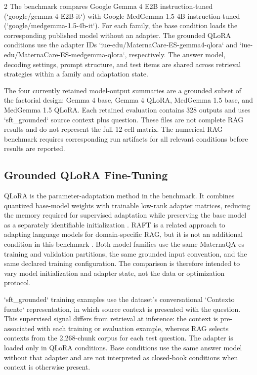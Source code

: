\documentclass[11pt]{article}
\begin{document}
\begin{multicols}{2}
The benchmark compares Google Gemma 4 E2B instruction-tuned (`google/gemma-4-E2B-it`) with Google MedGemma 1.5 4B instruction-tuned (`google/medgemma-1.5-4b-it`). For each family, the base condition loads the corresponding published model without an adapter. The grounded QLoRA conditions use the adapter IDs `iue-edu/MaternaCare-ES-gemma4-qlora` and `iue-edu/MaternaCare-ES-medgemma-qlora`, respectively. The answer model, decoding settings, prompt structure, and test items are shared across retrieval strategies within a family and adaptation state.

The four currently retained model-output summaries are a grounded subset of the factorial design: Gemma 4 base, Gemma 4 QLoRA, MedGemma 1.5 base, and MedGemma 1.5 QLoRA. Each retained evaluation contains 328 outputs and uses `sft\_grounded` source context plus question. These files are not complete RAG results and do not represent the full 12-cell matrix. The numerical RAG benchmark requires corresponding run artifacts for all relevant conditions before results are reported.

\subsection{Grounded QLoRA Fine-Tuning}

QLoRA is the parameter-adaptation method in the benchmark. It combines quantized base-model weights with trainable low-rank adapter matrices, reducing the memory required for supervised adaptation while preserving the base model as a separately identifiable initialization \cite{Dettmers2023QLoRA}. RAFT is a related approach to adapting language models for domain-specific RAG, but it is not an additional condition in this benchmark \cite{Zhang2024RAFT}. Both model families use the same MaternaQA-es training and validation partitions, the same grounded input convention, and the same declared training configuration. The comparison is therefore intended to vary model initialization and adapter state, not the data or optimization protocol.

`sft\_grounded` training examples use the dataset's conversational `Contexto fuente` representation, in which source context is presented with the question. This supervised signal differs from retrieval at inference: the context is pre-associated with each training or evaluation example, whereas RAG selects contexts from the 2,268-chunk corpus for each test question. The adapter is loaded only in QLoRA conditions. Base conditions use the same answer model without that adapter and are not interpreted as closed-book conditions when context is otherwise present.


\end{multicols}
\end{document}
